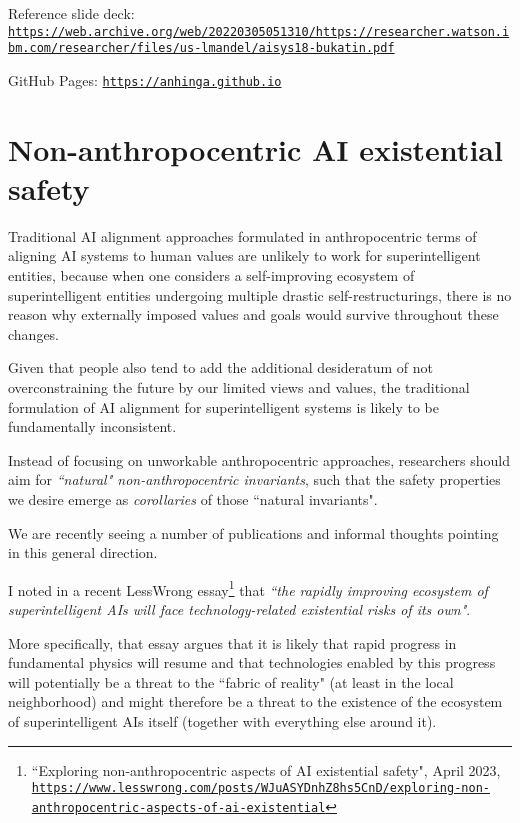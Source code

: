 \documentclass{article}
\begin{document}
Reference slide deck: \href{https://web.archive.org/web/20220305051310/https://researcher.watson.ibm.com/researcher/files/us-lmandel/aisys18-bukatin.pdf}{\tiny\tt https://web.archive.org/web/20220305051310/https://researcher.watson.ibm.com/researcher/files/us-lmandel/aisys18-bukatin.pdf}

GitHub Pages: \href{https://anhinga.github.io/}{\tt https://anhinga.github.io}

\pagebreak

\section{Non-anthropocentric AI existential safety}\label{sec:nonanthro}

Traditional AI alignment approaches formulated in anthropocentric terms of
aligning AI systems to human values are unlikely to work for superintelligent entities, 
because when one considers a self-improving ecosystem of superintelligent entities 
undergoing multiple drastic self-restructurings, there is no reason why
externally imposed values and goals would survive throughout these changes.

Given that people also tend to add the additional desideratum of not overconstraining
the future by our limited views and values, the traditional formulation of AI alignment for superintelligent
systems is likely to be fundamentally inconsistent.

Instead of focusing on unworkable anthropocentric approaches, researchers
should aim for {\em ``natural" non-anthropocentric invariants}, such that the safety properties we desire emerge as
{\em corollaries} of those ``natural invariants".

We are recently seeing a number of publications and informal thoughts pointing in this
general direction.

I noted in a recent LessWrong
essay\footnote{``Exploring non-anthropocentric aspects of AI existential safety", April 2023,\\
\href{https://www.lesswrong.com/posts/WJuASYDnhZ8hs5CnD/exploring-non-anthropocentric-aspects-of-ai-existential}
{\tt https://www.lesswrong.com/posts/WJuASYDnhZ8hs5CnD/exploring-non-anthropocentric-aspects-of-ai-existential}}
that {\em ``the rapidly improving ecosystem of superintelligent AIs will face technology-related existential risks of its own"}.

More specifically, that essay argues that it is likely that rapid progress in fundamental physics will resume
and that technologies enabled by this progress will potentially be a threat to the ``fabric of reality" (at least
in the local neighborhood) and might therefore be a threat to the existence of the ecosystem of superintelligent AIs 
itself (together with everything else around it).
\end{document}

